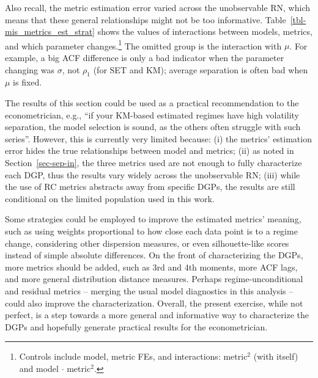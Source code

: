 \documentclass[
  letterpaper,
  DIV=11,
  numbers=noendperiod]{scrartcl}
\numberwithin{equation}{section}
\numberwithin{table}{section}
\numberwithin{figure}{section}
\begin{document}
Also recall, the metric estimation error varied across the unobservable
RN, which means that these general relationships might not be too
informative. Table~\ref{tbl-mis_metrics_est_strat} shows the values of
interactions between models, metrics, and which parameter
changes.\footnote{Controls include model, metric FEs, and interactions:
  metric\(^2\) (with itself) and model \(\cdot\) metric\(^2\).} The
omitted group is the interaction with \(\mu\). For example, a big ACF
difference is only a bad indicator when the parameter changing was
\(\sigma\), not \(\rho_1\) (for SET and KM); average separation is often
bad when \(\mu\) is fixed.

\begin{table}[!htbp]

\caption{\label{tbl-mis_metrics_est_strat}Models and estimated RC
metrics - RN interactions}

\centering{



}

\end{table}%

The results of this section could be used as a practical recommendation
to the econometrician, e.g., ``if your KM-based estimated regimes have
high volatility separation, the model selection is sound, as the others
often struggle with such series''. However, this is currently very
limited because: (i) the metrics' estimation error hides the true
relationships between model and metrics; (ii) as noted in
Section~\ref{sec-sep-in}, the three metrics used are not enough to fully
characterize each DGP, thus the results vary widely across the
unobservable RN; (iii) while the use of RC metrics abstracts away from
specific DGPs, the results are still conditional on the limited
population used in this work.

Some strategies could be employed to improve the estimated metrics'
meaning, such as using weights proportional to how close each data point
is to a regime change, considering other dispersion measures, or even
silhouette-like scores instead of simple absolute differences. On the
front of characterizing the DGPs, more metrics should be added, such as
3rd and 4th moments, more ACF lags, and more general distribution
distance measures. Perhaps regime-unconditional and residual metrics --
merging the usual model diagnostics in this analysis -- could also
improve the characterization. Overall, the present exercise, while not
perfect, is a step towards a more general and informative way to
characterize the DGPs and hopefully generate practical results for the
econometrician.
\end{document}
